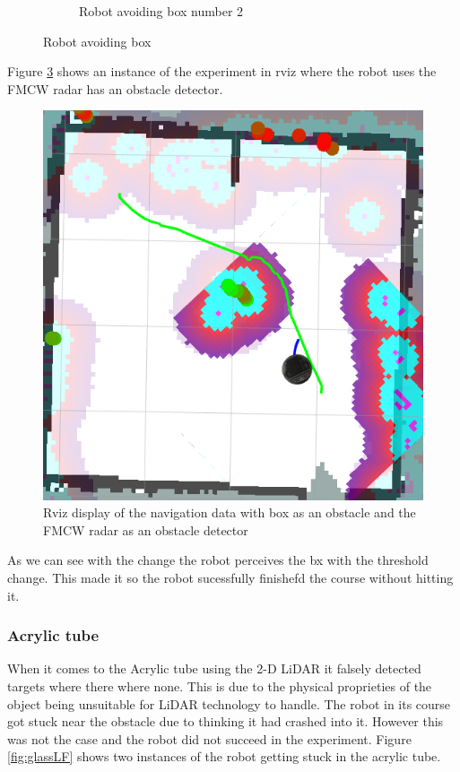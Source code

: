 \begin{figure}[ht!]
\begin{subfigure}[b]{0.47\linewidth}
    \caption{Robot avoiding box  number 2}
    \label{fig::boxRS2}
  \end{subfigure}
  \caption{Robot avoiding box}
  \label{fig:boxRS}
\end{figure}
Figure \ref{fig:rvizboxradar} shows an instance of the experiment in rviz where the robot uses the \ac{FMCW} \ac{radar} has an obstacle detector.
\begin{figure}[ht!]
\centerline{\includegraphics [width=0.5 \textwidth]{imgs/chapter5/rvizboxradar.png}}
\caption[Navigation data with box as an obstacle and with the \ac{FMCW} \ac{radar}]{Rviz display of the navigation data with box as an obstacle and the \ac{FMCW} \ac{radar} as an obstacle detector}
\label{fig:rvizboxradar}
\end{figure}
As we can see  with the change the robot perceives the bx with the threshold change. This made it so the robot sucessfully finishefd the course without hitting it.
\subsubsection{Acrylic tube}


When it comes to the Acrylic tube using the 2-D \ac{LiDAR} it falsely detected targets where there where none. This is due to the physical proprieties of the object being unsuitable for \ac{LiDAR} technology to handle. The robot in its course got stuck near the obstacle due to thinking it had crashed into it. However this was not the case and the robot did not succeed in the experiment. Figure \ref{fig:glassLF} shows two instances of the robot getting stuck in the acrylic tube.


